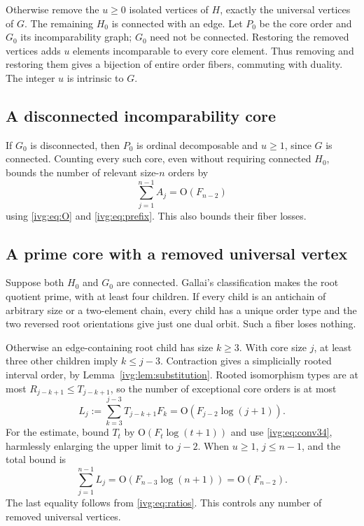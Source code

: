 \documentclass[11pt,letterpaper]{article}
\theoremstyle{definition}\newtheorem{definition}[theorem]{Definition}
\theoremstyle{remark}\newtheorem{remark}[theorem]{Remark}
\newcommand{\OO}{\mathrm O}
\begin{document}
Otherwise remove the $u\ge0$ isolated vertices of $H$, exactly the universal vertices of $G$. The remaining $H_0$ is connected with an edge. Let $P_0$ be the core order and $G_0$ its incomparability graph; $G_0$ need not be connected. Restoring the removed vertices adds $u$ elements incomparable to every core element. Thus removing and restoring them gives a bijection of entire order fibers, commuting with duality. The integer $u$ is intrinsic to $G$.

\subsection{A disconnected incomparability core}
If $G_0$ is disconnected, then $P_0$ is ordinal decomposable and $u\ge1$, since $G$ is connected. Counting every such core, even without requiring connected $H_0$, bounds the number of relevant size-$n$ orders by
\begin{equation}\label{ivg:eq:case1}
 \sum_{j=1}^{n-1}A_j=\OO(F_{n-2})
\end{equation}
using \eqref{ivg:eq:O} and \eqref{ivg:eq:prefix}. This also bounds their fiber losses.

\subsection{A prime core with a removed universal vertex}
Suppose both $H_0$ and $G_0$ are connected. Gallai's classification makes the root quotient prime, with at least four children. If every child is an antichain of arbitrary size or a two-element chain, every child has a unique order type and the two reversed root orientations give just one dual orbit. Such a fiber loses nothing.

Otherwise an edge-containing root child has size $k\ge3$. With core size $j$, at least three other children imply $k\le j-3$. Contraction gives a simplicially rooted interval order, by Lemma~\ref{ivg:lem:substitution}. Rooted isomorphism types are at most $R_{j-k+1}\le T_{j-k+1}$, so the number of exceptional core orders is at most
\begin{equation}\label{ivg:eq:L}
 L_j:=\sum_{k=3}^{j-3}T_{j-k+1}F_k
 =\OO(F_{j-2}\log(j+1)).
\end{equation}
For the estimate, bound $T_t$ by $\OO(F_t\log(t+1))$ and use \eqref{ivg:eq:conv34}, harmlessly enlarging the upper limit to $j-2$. When $u\ge1$, $j\le n-1$, and the total bound is
\begin{equation}\label{ivg:eq:case2}
 \sum_{j=1}^{n-1}L_j
 =\OO(F_{n-3}\log(n+1))=\OO(F_{n-2}).
\end{equation}
The last equality follows from \eqref{ivg:eq:ratios}. This controls any number of removed universal vertices.
\end{document}

